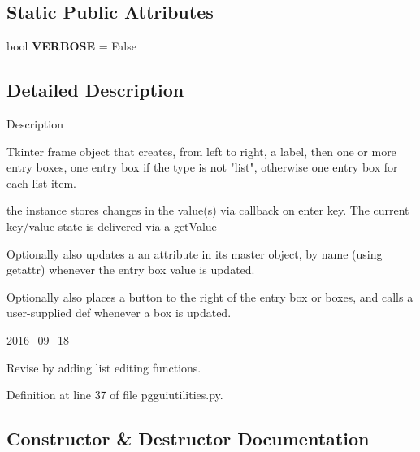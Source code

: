 \subsection*{Static Public Attributes}
\begin{DoxyCompactItemize}
\item 
bool {\bfseries V\+E\+R\+B\+O\+SE} = False\hypertarget{classnegui_1_1pgguiutilities_1_1KeyValFrame_a7ab96ae24edc45cf94f7cf10bc412557}{}\label{classnegui_1_1pgguiutilities_1_1KeyValFrame_a7ab96ae24edc45cf94f7cf10bc412557}

\end{DoxyCompactItemize}


\subsection{Detailed Description}
\begin{DoxyVerb}Description

Tkinter frame object that creates,
from left to right, a label, then 
one or more entry boxes, one entry box 
if the type is not "list", otherwise one 
entry box for each list item.

the instance stores changes in the value(s)
via callback on enter key.  The current
key/value state is delivered via a getValue

Optionally also updates a an attribute
in its master object, by name (using getattr)
whenever the entry box value is updated.

Optionally also places a button to the right
of the entry box or boxes, and calls a user-supplied
def whenever a box is updated.

2016_09_18

Revise by adding list editing functions.\end{DoxyVerb}
 

Definition at line 37 of file pgguiutilities.\+py.



\subsection{Constructor \& Destructor Documentation}
